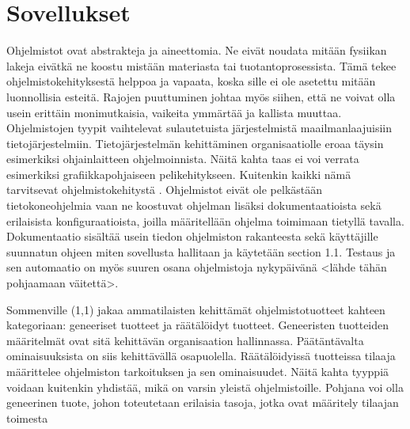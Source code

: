 \documentclass[utf8]{gradu3}
\begin{document}
\section{Sovellukset}
Ohjelmistot ovat abstrakteja ja aineettomia. Ne eivät noudata mitään fysiikan lakeja eivätkä ne koostu mistään materiasta tai tuotantoprosessista. Tämä tekee ohjelmistokehityksestä helppoa ja vapaata, koska sille ei ole asetettu mitään luonnollisia esteitä. Rajojen puuttuminen johtaa myös siihen, että ne voivat olla usein erittäin monimutkaisia, vaikeita ymmärtää ja kallista muuttaa. Ohjelmistojen tyypit vaihtelevat sulautetuista järjestelmistä maailmanlaajuisiin tietojärjestelmiin. Tietojärjestelmän kehittäminen organisaatiolle eroaa täysin esimerkiksi ohjainlaitteen ohjelmoinnista. Näitä kahta taas ei voi verrata esimerkiksi grafiikkapohjaiseen pelikehitykseen. Kuitenkin kaikki nämä tarvitsevat ohjelmistokehitystä \parencite{Sommenville}. Ohjelmistot eivät ole pelkästään tietokoneohjelmia vaan ne koostuvat ohjelman lisäksi dokumentaatioista sekä erilaisista konfiguraatioista, joilla määritellään ohjelma toimimaan tietyllä tavalla. Dokumentaatio sisältää usein tiedon ohjelmiston rakanteesta sekä käyttäjille suunnatun ohjeen miten sovellusta hallitaan ja käytetään \parencite{Sommerville} section 1.1. Testaus ja sen automaatio on myös suuren osana ohjelmistoja nykypäivänä <lähde tähän pohjaamaan väitettä>. 


Sommenville (1,1) jakaa ammatilaisten kehittämät ohjelmistotuotteet kahteen kategoriaan: geneeriset tuotteet ja räätälöidyt tuotteet. Geneeristen tuotteiden määritelmät ovat sitä kehittävän organisaation hallinnassa. Päätäntävalta ominaisuuksista on siis kehittävällä osapuolella. Räätälöidyissä tuotteissa tilaaja määrittelee ohjelmiston tarkoituksen ja sen ominaisuudet. Näitä kahta tyyppiä voidaan kuitenkin yhdistää, mikä on varsin yleistä ohjelmistoille. Pohjana voi olla geneerinen tuote, johon toteutetaan erilaisia tasoja, jotka ovat määritely tilaajan toimesta \parencite{Sommerville} 
\end{document}
